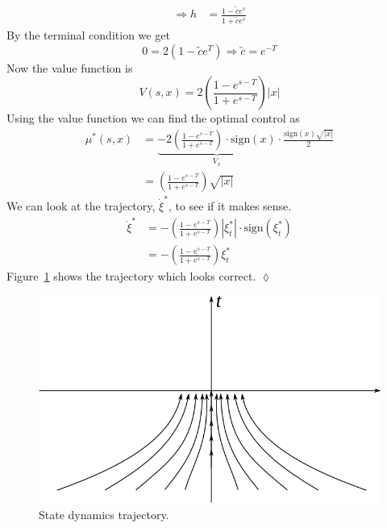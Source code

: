 \begin{example}
\begin{align*}
\Rightarrow h &= \frac{1-\tilde{c}e^s}{1+\tilde{c}e^s}
\end{align*}
By the terminal condition we get
$$0 = 2(1-\tilde{c}e^T) \Rightarrow \tilde{c} = e^{-T}$$
Now the value function is
$$V(s,x) = 2\left(\frac{1-e^{s-T}}{1+e^{s-T}}\right)|x|$$
Using the value function we can find the optimal control as
\begin{align*}
\mu^\ast(s,x) &= \underbrace{-2\left(\frac{1-e^{s-T}}{1+e^{s-T}}\right)\cdot\text{sign}(x)}_{V_x}\cdot\frac{\text{sign}(x)\sqrt{|x|}}{2} \\
&= \left(\frac{1-e^{s-T}}{1+e^{s-T}}\right)\sqrt{|x|}
\end{align*}
We can look at the trajectory, $\dot{\xi}^\ast$, to see if it makes sense.
\begin{align*}
\dot{\xi}^\ast &= -\left(\frac{1-e^{s-T}}{1+e^{s-T}}\right)|\xi_t^\ast|\cdot\text{sign}(\xi_t^\ast) \\
&= -\left(\frac{1-e^{s-T}}{1+e^{s-T}}\right)\xi_t^\ast
\end{align*}
Figure~\ref{fig:13trajectory} shows the trajectory which looks correct.
$\lozenge$
\end{example}

\begin{figure}[ht!]
\centering
\includegraphics[width=.6\textwidth]{images/13trajectory}
\caption{State dynamics trajectory.}
\label{fig:13trajectory}
\end{figure}%

